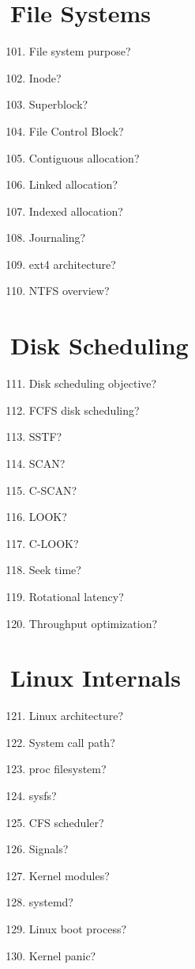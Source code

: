 \section{File Systems}

\begin{enumerate}
\setcounter{enumi}{100}
\item File system purpose?
\item Inode?
\item Superblock?
\item File Control Block?
\item Contiguous allocation?
\item Linked allocation?
\item Indexed allocation?
\item Journaling?
\item ext4 architecture?
\item NTFS overview?
\end{enumerate}

\section{Disk Scheduling}

\begin{enumerate}
\setcounter{enumi}{110}
\item Disk scheduling objective?
\item FCFS disk scheduling?
\item SSTF?
\item SCAN?
\item C-SCAN?
\item LOOK?
\item C-LOOK?
\item Seek time?
\item Rotational latency?
\item Throughput optimization?
\end{enumerate}

\section{Linux Internals}

\begin{enumerate}
\setcounter{enumi}{120}
\item Linux architecture?
\item System call path?
\item proc filesystem?
\item sysfs?
\item CFS scheduler?
\item Signals?
\item Kernel modules?
\item systemd?
\item Linux boot process?
\item Kernel panic?
\end{enumerate}

